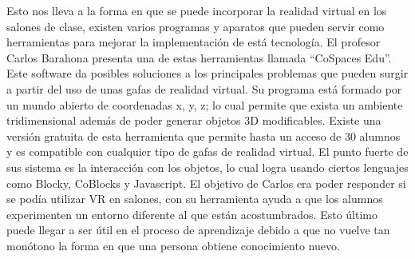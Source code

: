 Esto nos lleva a la forma en que se puede incorporar la realidad virtual en los salones de clase, existen varios programas y aparatos que pueden servir como herramientas para mejorar la implementación de está tecnología. El profesor Carlos Barahona presenta una de estas herramientas llamada “CoSpaces Edu”. Este software da posibles soluciones a los principales problemas que pueden surgir a partir del uso de unas gafas de realidad virtual. Su programa está formado por un mundo abierto de coordenadas x, y, z; lo cual permite que exista un ambiente tridimensional además de poder generar objetos 3D modificables. Existe una versión gratuita de esta herramienta que permite hasta un acceso de 30 alumnos y es compatible con cualquier tipo de gafas de realidad virtual. El punto fuerte de sus sistema es la interacción con los objetos, lo cual logra usando ciertos lenguajes como Blocky, CoBlocks y Javascript. El objetivo de Carlos era poder responder si se podía utilizar VR en salones, con su herramienta ayuda a que los alumnos experimenten un entorno diferente al que están acostumbrados. Esto último puede llegar a ser útil en el proceso de aprendizaje debido a que no vuelve tan monótono la forma en que una persona obtiene conocimiento nuevo. \parencite{barahona2019cospaces}
